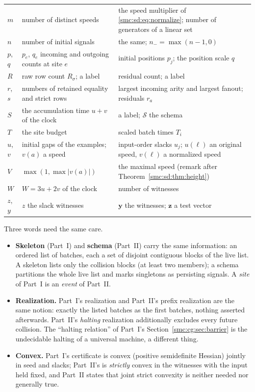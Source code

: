 \documentclass[11pt,letterpaper]{article}
\numberwithin{equation}{section}
\theoremstyle{definition}
\theoremstyle{remark}
\newcommand{\cS}{\mathcal S}
\newcommand{\nminus}{n_{-}}
\begin{document}
\begin{center}
\begin{longtable}{@{}L{0.09\textwidth}L{0.43\textwidth}L{0.42\textwidth}@{}}
$m$ & number of distinct speeds & the speed multiplier of \eqref{smc:sd:eq:normalize}; number of generators of a linear set\\
$n$ & number of initial signals & the same; $\nminus=\max(n-1,0)$\\
$p$, $q$ & $p_e$, $q_e$ incoming and outgoing counts at site $e$ & initial positions $p_j$; the position scale $q$\\
$R$ & raw row count $R_\sigma$; a label & residual count; a label\\
$r$, $s$ & numbers of retained equality and strict rows & largest incoming arity and largest fanout; residuals $r_a$\\
$S$ & the accumulation time $u+v$ of the clock & a label; $\cS$ the schema\\
$T$ & the site budget & scaled batch times $T_i$\\
$u$, $v$ & initial gaps of the examples; $v(a)$ a speed & input-order slacks $u_j$; $u(\ell)$ an original speed, $v(\ell)$ a normalized speed\\
$V$ & $\max(1,\max|v(a)|)$ & the maximal speed (remark after Theorem~\ref{smc:sd:thm:height})\\
$W$ & $W=3u+2v$ of the clock & number of witnesses\\
$z$, $y$ & $z$ the slack witnesses & $\mathbf y$ the witnesses; $\mathbf z$ a test vector\\
\bottomrule
\end{longtable}
\end{center}

Three words need the same care.
\begin{itemize}
\item \textbf{Skeleton} (Part~I) and \textbf{schema} (Part~II) carry the same information: an ordered list of batches, each a set of disjoint contiguous blocks of the live list. A skeleton lists only the collision blocks (at least two members); a schema partitions the whole live list and marks singletons as persisting signals. A \emph{site} of Part~I is an \emph{event} of Part~II.
\item \textbf{Realization.} Part~I's realization and Part~II's prefix realization are the same notion: exactly the listed batches as the first batches, nothing asserted afterwards. Part~II's \emph{halting} realization additionally excludes every future collision. The ``halting relation'' of Part~I's Section~\ref{smc:cg:sec:barrier} is the undecidable halting of a universal machine, a different thing.
\item \textbf{Convex.} Part~I's certificate is convex (positive semidefinite Hessian) jointly in seed and slacks; Part~II's is \emph{strictly} convex in the witnesses with the input held fixed, and Part~II states that joint strict convexity is neither needed nor generally true.
\end{itemize}
\end{document}
